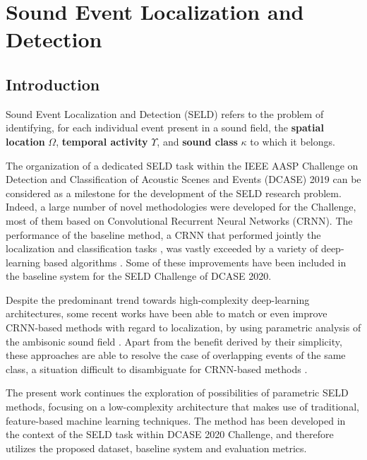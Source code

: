 \chapter{Sound Event Localization and Detection}
\label{chap:seld2019}


\section{Introduction}
\label{sec:intro}
%


Sound Event Localization and Detection (SELD) refers to the problem of identifying, for each individual event present in a sound field, the \textbf{spatial location} $\Omega$, \textbf{temporal activity} $\Upsilon$, and \textbf{sound class} $\kappa$ to which it belongs. 

The organization of a dedicated SELD task within the IEEE AASP Challenge on Detection and Classification of Acoustic Scenes and Events (DCASE) 2019 can be considered as a milestone for the development of the SELD research problem. 
Indeed, a large number of novel methodologies were developed for the Challenge, most of them based on Convolutional Recurrent Neural Networks (CRNN). The performance of the baseline method, a CRNN that performed jointly the localization and classification tasks \cite{Adavanne2018_JSTSP}, was vastly exceeded by a variety of deep-learning based algorithms \cite{kapka2019sound, Cao2019, grondin2019sound}.
Some of these improvements have been included in the baseline system for the SELD Challenge of DCASE 2020. 

Despite the predominant trend towards high-complexity deep-learning architectures, some recent works have been able to match or even improve CRNN-based methods with regard to localization, by using parametric analysis of the ambisonic sound field \cite{perez2019hybrid, nguyen2020sequence}.  
Apart from the benefit derived by their simplicity, these approaches are able to resolve the case of overlapping events of the same class, a situation difficult to disambiguate for CRNN-based methods \cite{politis2020dataset}.


The present work continues the exploration of possibilities of parametric SELD methods, focusing on a low-complexity architecture that makes use of traditional, feature-based machine learning techniques. The method has been developed in the context of the SELD task within DCASE 2020 Challenge, and therefore utilizes the proposed dataset, baseline system and evaluation metrics.

